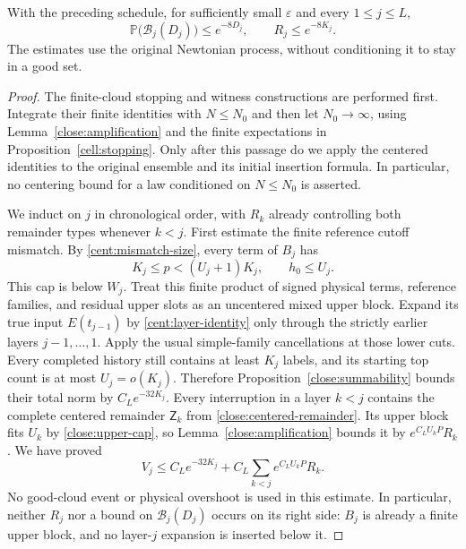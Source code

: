 \begin{proposition}
\label{close:tails}
With the preceding schedule, for sufficiently small
$\varepsilon$ and every $1\leq j\leq L$,
\begin{equation}\label{close:actual-tail-bounds}
 \mathbb P\bigl(\mathcal B_j(D_j)\bigr)\leq e^{-8D_j},
 \qquad R_j\leq e^{-8K_j}.
\end{equation}
The estimates use the original Newtonian process, without
conditioning it to stay in a good set.
\end{proposition}
\begin{proof}
The finite-cloud stopping and witness constructions are performed
first. Integrate their finite identities with $N\leq N_0$ and
then let $N_0\to\infty$, using
Lemma~\ref{close:amplification} and the finite expectations in
Proposition~\ref{cell:stopping}. Only after this passage do we
apply the centered identities to the original ensemble and its
initial insertion formula. In particular, no centering bound for
a law conditioned on $N\leq N_0$ is asserted.

We induct on $j$ in chronological order, with $R_k$ already
controlling both remainder types whenever $k<j$.
First estimate the finite reference cutoff mismatch. By
\eqref{cent:mismatch-size}, every term of $B_j$ has
\[
 K_j\leq p<(U_j+1)K_j,\qquad h_0\leq U_j.
\]
This cap is below $W_j$. Treat this finite product of signed
physical terms, reference families, and residual upper slots as
an uncentered mixed upper block. Expand its true input
$E(t_{j-1})$ by \eqref{cent:layer-identity} only through the
strictly earlier layers $j-1,\ldots,1$. Apply the usual
simple-family cancellations at those lower cuts. Every completed
history still contains at least $K_j$ labels, and its starting
top count is at most $U_j=o(K_j)$. Therefore
Proposition~\ref{close:summability} bounds their total norm by
$C_L e^{-32K_j}$. Every interruption in a layer $k<j$ contains
the complete centered remainder $\mathsf Z_k$ from
\eqref{close:centered-remainder}. Its upper block fits $U_k$
by \eqref{close:upper-cap}, so
Lemma~\ref{close:amplification} bounds it by
$e^{C_LU_kP}R_k$. We have proved
\begin{equation}\label{close:reference-cutoff-bound}
 V_j\leq C_L e^{-32K_j}
       +C_L\sum_{k<j}e^{C_LU_kP}R_k.
\end{equation}
No good-cloud event or physical overshoot is used in this
estimate. In particular, neither $R_j$ nor a bound on
$\mathcal B_j(D_j)$ occurs on its right side: $B_j$ is already
a finite upper block, and no layer-$j$ expansion is inserted
below it.


\end{proof}
